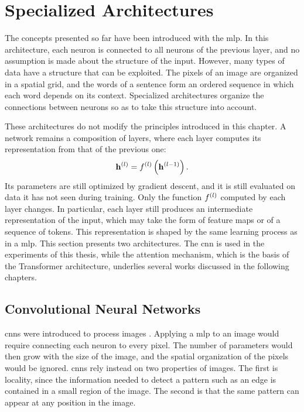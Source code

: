 \section{Specialized Architectures}\label{sec:deep_learning_specialized_architectures}

The concepts presented so far have been introduced with the \gls{mlp}.
In this architecture, each neuron is connected to all neurons of the previous layer, and no assumption is made about the structure of the input.
However, many types of data have a structure that can be exploited.
The pixels of an image are organized in a spatial grid, and the words of a sentence form an ordered sequence in which each word depends on its context.
Specialized architectures organize the connections between neurons so as to take this structure into account.

These architectures do not modify the principles introduced in this chapter.
A network remains a composition of layers, where each layer computes its representation from that of the previous one:
\begin{equation}
\latentRepresentation[l] = \LayerFunction{l}\left(\latentRepresentation[l-1]\right).
\label{eq:layer_function}
\end{equation}
Its parameters are still optimized by gradient descent, and it is still evaluated on data it has not seen during training.
Only the function $f^{(l)}$ computed by each layer changes.
In particular, each layer still produces an intermediate representation of the input, which may take the form of feature maps or of a sequence of tokens.
This representation is shaped by the same learning process as in a \gls{mlp}.
This section presents two architectures.
The \gls{cnn} is used in the experiments of this thesis, while the attention mechanism, which is the basis of the Transformer architecture, underlies several works discussed in the following chapters.

\subsection{Convolutional Neural Networks}\label{subsec:deep_learning_convolutional_neural_networks}

\glspl{cnn} were introduced to process images \parencite{lecun1989backpropagation}.
Applying a \gls{mlp} to an image would require connecting each neuron to every pixel.
The number of parameters would then grow with the size of the image, and the spatial organization of the pixels would be ignored.
\glspl{cnn} rely instead on two properties of images.
The first is locality, since the information needed to detect a pattern such as an edge is contained in a small region of the image.
The second is that the same pattern can appear at any position in the image.

